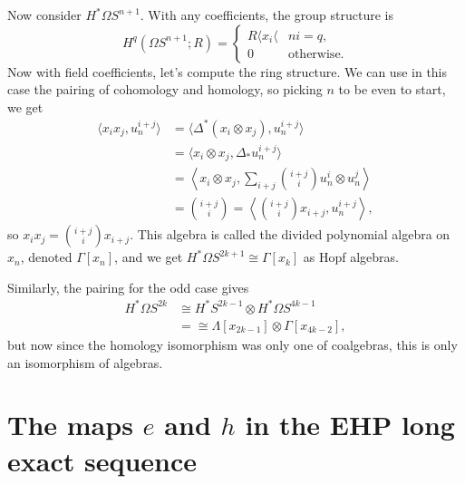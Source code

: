 \documentclass{article}
\newcommand{\Loops}{\Omega}
\begin{document}
Now consider $H^* \Loops S^{n+1}$.  With any coefficients, the group structure is
\[
H^q(\Loops S^{n+1}; R) = \begin{cases} R \langle x_i \langle & ni = q, \\ 0 & \mathrm{otherwise}. \end{cases}
\]
Now with field coefficients, let's compute the ring structure.  We can use in this case the pairing of cohomology and homology, so picking $n$ to be even to start, we get
\begin{align*}
\langle x_i x_j, u_n^{i+j} \rangle & = \langle \Delta^*(x_i \otimes x_j), u_n^{i+j} \rangle \\
& = \langle x_i \otimes x_j, \Delta_* u_n^{i+j} \rangle \\
& = \left\langle x_i \otimes x_j, \sum_{i+j} \binom{i+j}{i} u_n^i \otimes u_n^j \right\rangle \\
& = \binom{i+j}{i} = \left\langle \binom{i+j}{i} x_{i+j}, u_n^{i+j} \right\rangle,
\end{align*}
so $x_i x_j = \binom{i+j}{i} x_{i+j}$.  This algebra is called the divided polynomial algebra on $x_n$, denoted $\Gamma[x_n]$, and we get $H^* \Loops S^{2k+1} \cong \Gamma[x_k]$ as Hopf algebras.

Similarly, the pairing for the odd case gives
\begin{align*}
H^* \Loops S^{2k} & \cong H^* S^{2k-1} \otimes H^* \Loops S^{4k-1} \\
& = \cong \Lambda[x_{2k-1}] \otimes \Gamma[x_{4k-2}],
\end{align*}
but now since the homology isomorphism was only one of coalgebras, this is only an isomorphism of algebras.


\section{The maps $e$ and $h$ in the EHP long exact sequence} %
\end{document}
